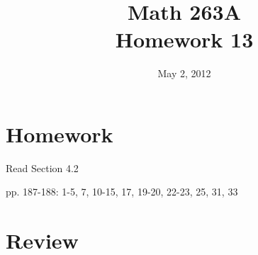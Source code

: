 \documentclass[fleqn]{exam}
\title{Math 263A \\ Homework 13}
\date{May 2, 2012}
\begin{document}
\maketitle

\section{Homework}

\begin{itemize*}
  \item Read Section 4.2
  \item pp. 187-188: 1-5, 7, 10-15, 17, 19-20, 22-23, 25, 31, 33
\end{itemize*}

\section{Review}
\end{document}
